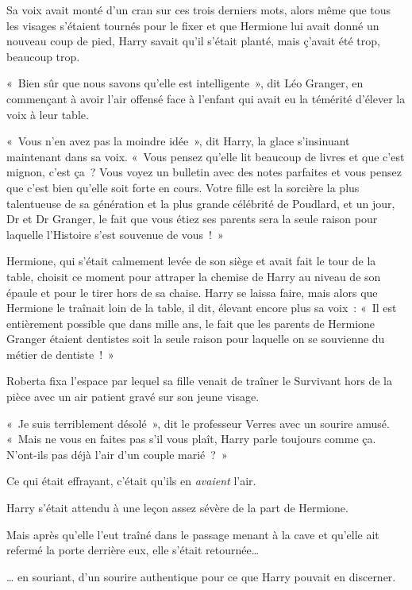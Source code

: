 Sa voix avait monté d'un cran sur ces trois derniers mots, alors même que tous les visages s'étaient tournés pour le fixer et que Hermione lui avait donné un nouveau coup de pied, Harry savait qu'il s'était planté, mais ç'avait été trop, beaucoup trop.

«~Bien sûr que nous savons qu'elle est intelligente~», dit Léo Granger, en commençant à avoir l'air offensé face à l'enfant qui avait eu la témérité d'élever la voix à leur table.

«~Vous n'en avez pas la moindre idée~», dit Harry, la glace s'insinuant maintenant dans sa voix. «~Vous pensez qu'elle lit beaucoup de livres et que c'est mignon, c'est ça~? Vous voyez un bulletin avec des notes parfaites et vous pensez que c'est bien qu'elle soit forte en cours. Votre fille est la sorcière la plus talentueuse de sa génération et la plus grande célébrité de Poudlard, et un jour, Dr et Dr Granger, le fait que vous étiez ses parents sera la seule raison pour laquelle l'Histoire s'est souvenue de vous~!~»

Hermione, qui s'était calmement levée de son siège et avait fait le tour de la table, choisit ce moment pour attraper la chemise de Harry au niveau de son épaule et pour le tirer hors de sa chaise. Harry se laissa faire, mais alors que Hermione le traînait loin de la table, il dit, élevant encore plus sa voix~: «~Il est entièrement possible que dans mille ans, le fait que les parents de Hermione Granger étaient dentistes soit la seule raison pour laquelle on se souvienne du métier de dentiste~!~»

\later

Roberta fixa l'espace par lequel sa fille venait de traîner le Survivant hors de la pièce avec un air patient gravé sur son jeune visage.

«~Je suis terriblement désolé~», dit le professeur Verres avec un sourire amusé. «~Mais ne vous en faites pas s'il vous plaît, Harry parle toujours comme ça. N'ont-ils pas déjà l'air d'un couple marié~?~»

Ce qui était effrayant, c'était qu'ils en \emph{avaient} l'air.

\later

Harry s'était attendu à une leçon assez sévère de la part de Hermione.

Mais après qu'elle l'eut traîné dans le passage menant à la cave et qu'elle ait refermé la porte derrière eux, elle s'était retournée…

… en souriant, d'un sourire authentique pour ce que Harry pouvait en discerner.

